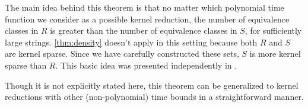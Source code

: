 \begin{figure}
\begin{center}
  \end{center}
\end{figure}

The main idea behind this theorem is that no matter which polynomial time function we consider as a possible kernel reduction, the number of equivalence classes in $R$ is greater than the number of equivalence classes in $S$, for sufficiently large strings.
\autoref{thm:density} doesn't apply in this setting because both $R$ and $S$ are kernel sparse.
Since we have carefully constructed these sets, $S$ is more kernel sparse than $R$.
This basic idea was presented independently in \autocite[Lemma~2.3]{gz14}.

Though it is not explicitly stated here, this theorem can be generalized to kernel reductions with other (non-polynomial) time bounds in a straightforward manner.

